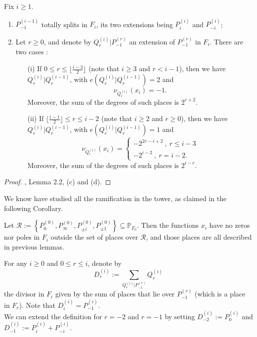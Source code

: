 \documentclass[10pt]{article}
\begin{document}
\begin{lemma} \label{ext P moins 1}
Fix $i \geq 1$. 
\begin{enumerate}
\item $P_{-1}^{(i-1)}$ totally splits in $F_i$, its two extensions being $P_i^{(i)}$ and $P_{-i}^{(i)}$;
\item Let $r \geq 0$, and denote by $Q_r^{(i)}|P_{-1}^{(r)}$ an extension of $P_{-1}^{(r)}$ in $F_i$. There are two cases :
\begin{itemize}
\item[(i)] If $0 \leq r \leq \lfloor \frac{i-3}{2} \rfloor$ (note that $i \geq 3$ and $r<i-1$), then we have $Q_r^{(i)}|Q_r^{(i-1)}$, with $e(Q_r^{(i)}|Q_r^{(i-1)}) =2$ and 
\[\nu_{Q_r^{(i)}}(x_i)=-1.\]  
Moreover, the sum of the degrees of such places is $2^{r+2}$.
\item[(ii)] If $\lfloor \frac{i-1}{2} \rfloor \leq r \leq i-2$ (note that $i \geq 2$ and $r\geq 0$), then we have $Q_r^{(i)}|Q_r^{(i-1)}$, with $e(Q_r^{(i)}|Q_r^{(i-1)}) =1$ and
\begin{equation*}
\nu_{Q_r^{(i)}}(x_i) = \left\{ \begin{array}{ll}
-2^{2r-i+2} \ , \ r \leq i-3 \\
-2^{i-2} \ , \ r =i-2.
\end{array}
\right.
\end{equation*} 
Moreover, the sum of the degrees of such places is $2^{i-r}$.
\end{itemize}
\end{enumerate}
\end{lemma}

\s

\begin{proof}
\cite{NOQ}, Lemma 2.2, (c) and (d).
\end{proof}

\s

We know have studied all the ramification in the tower, as claimed in the following Corollary.

\begin{corollary}
Let $\mathcal{R}:= \left\{P_0^{(0)},P_{\infty}^{(0)},P_{\pm i}^{(0)},P_{\pm 1}^{(0)}\right\} \subseteq \mathbb{P}_{F_0}$. Then the functions $x_i$ have no zeros nor poles in $F_i$ outside the set of places over $\mathcal{R}$, and those places are all described in previous lemmas.
\end{corollary}

\s

\begin{def1} \label{divisors D's} For any $i \geq 0$ and $0 \leq r \leq i$, denote by
\[D_r^{(i)} := \sum\limits_{Q_r^{(i)}|P_{-1}^{(r)}} Q_r^{(i)}\]
the divisor in $F_i$ given by the sum of places that lie over $P_{-1}^{(r)}$ (which is a place in $F_r$). Note that $D_i^{(i)} = P_{-1}^{(i)}$. \\
We can extend the definition for $r=-2$ and $r=-1$ by setting $D_{-2}^{(i)} := P_0^{(i)}$ and $D_{-1}^{(i)} := P_i^{(i)} + P_{-i}^{(i)}$.
\end{def1}
\end{document}
